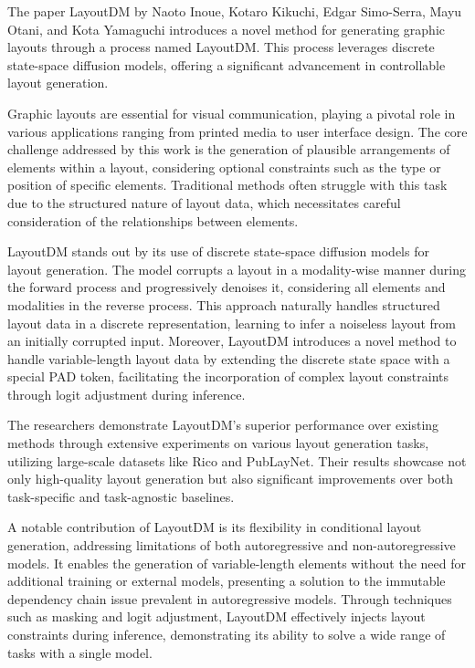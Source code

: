 The paper LayoutDM \cite*{Inoue2023LayoutDM} by Naoto Inoue, Kotaro Kikuchi, Edgar Simo-Serra, Mayu Otani, and Kota Yamaguchi introduces a novel method for generating graphic layouts through a process named LayoutDM. This process leverages discrete state-space diffusion models, offering a significant advancement in controllable layout generation.

Graphic layouts are essential for visual communication, playing a pivotal role in various applications ranging from printed media to user interface design. The core challenge addressed by this work is the generation of plausible arrangements of elements within a layout, considering optional constraints such as the type or position of specific elements. Traditional methods often struggle with this task due to the structured nature of layout data, which necessitates careful consideration of the relationships between elements.

LayoutDM stands out by its use of discrete state-space diffusion models for layout generation. The model corrupts a layout in a modality-wise manner during the forward process and progressively denoises it, considering all elements and modalities in the reverse process. This approach naturally handles structured layout data in a discrete representation, learning to infer a noiseless layout from an initially corrupted input. Moreover, LayoutDM introduces a novel method to handle variable-length layout data by extending the discrete state space with a special PAD token, facilitating the incorporation of complex layout constraints through logit adjustment during inference.

The researchers demonstrate LayoutDM's superior performance over existing methods through extensive experiments on various layout generation tasks, utilizing large-scale datasets like Rico and PubLayNet. Their results showcase not only high-quality layout generation but also significant improvements over both task-specific and task-agnostic baselines.

A notable contribution of LayoutDM is its flexibility in conditional layout generation, addressing limitations of both autoregressive and non-autoregressive models. It enables the generation of variable-length elements without the need for additional training or external models, presenting a solution to the immutable dependency chain issue prevalent in autoregressive models. Through techniques such as masking and logit adjustment, LayoutDM effectively injects layout constraints during inference, demonstrating its ability to solve a wide range of tasks with a single model.


